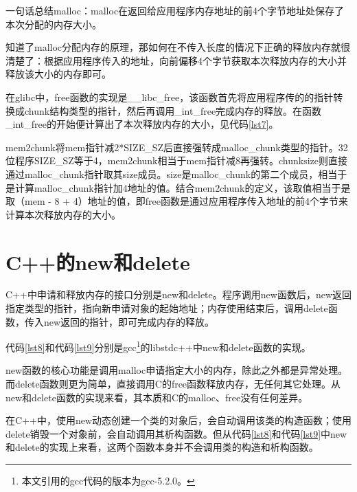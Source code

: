 \documentclass[a4paper, 12pt, titlepage]{article}
\begin{document}
\begin{spacing}{1.0}
  
\end{spacing}

一句话总结malloc：malloc在返回给应用程序内存地址的前4个字节地址处保存了本次分配的内存大小。

知道了malloc分配内存的原理，那如何在不传入长度的情况下正确的释放内存就很清楚了：根据应用程序传入的地址，向前偏移4个字节获取本次释放内存的大小并释放该大小的内存即可。

在glibc中，free函数的实现是\_\_libc\_free，该函数首先将应用程序传的的指针转换成chunk结构类型的指针，然后再调用\_int\_free完成内存的释放。在函数\_int\_free的开始便计算出了本次释放内存的大小，见代码\ref{lst7}。
\begin{spacing}{1.0}
  
\end{spacing}

mem2chunk将mem指针减2*SIZE\_SZ后直接强转成malloc\_chunk类型的指针。32位程序SIZE\_SZ等于4，mem2chunk相当于mem指针减8再强转。chunksize则直接通过malloc\_chunk指针取其size成员。size是malloc\_chunk的第二个成员，相当于是计算malloc\_chunk指针加4地址的值。结合mem2chunk的定义，该取值相当于是取（mem - 8 + 4）地址的值，即free函数是通过应用程序传入地址的前4个字节来计算本次释放内存的大小。

\section{C++的new和delete}
C++中申请和释放内存的接口分别是new和delete。程序调用new函数后，new返回指定类型的指针，指向新申请对象的起始地址；内存使用结束后，调用delete函数，传入new返回的指针，即可完成内存的释放。

代码\ref{lst8}和代码\ref{lst9}分别是gcc\footnote{本文引用的gcc代码的版本为gcc-5.2.0。}的libstdc++中new和delete函数的实现。
\begin{spacing}{1.0}
  
\end{spacing}

\begin{spacing}{1.0}
  
\end{spacing}
new函数的核心功能是调用malloc申请指定大小的内存，除此之外都是异常处理。而delete函数则更为简单，直接调用C的free函数释放内存，无任何其它处理。从new和delete函数的实现来看，其本质和C的malloc、free没有任何差异。

在C++中，使用new动态创建一个类的对象后，会自动调用该类的构造函数；使用delete销毁一个对象前，会自动调用其析构函数。但从代码\ref{lst8}和代码\ref{lst9}中new和delete的实现上来看，这两个函数本身并不会调用类的构造和析构函数。
\end{document}
